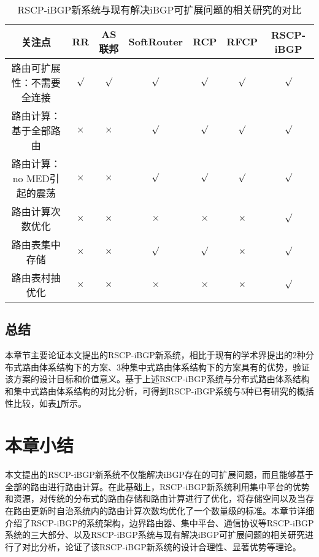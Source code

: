 \begin{table}[h]
	\centering
	\caption{RSCP-iBGP新系统与现有解决iBGP可扩展问题的相关研究的对比}
    \label{tab:compare}

    \begin{tabular}{@{}ccccccc@{}}
\toprule
关注点              & RR & AS联邦 & SoftRouter & RCP & RFCP & RSCP-iBGP \\ \midrule
路由可扩展性：不需要全连接    &  $\surd$ &  $\surd$  & $\surd$  &$\surd$ & $\surd$  &$\surd$       \\
路由计算：基于全部路由      &   $\times$ &  $\times$  & $\surd$  &$\surd$ & $\surd$  &$\surd$  \\
路由计算：no MED引起的震荡 & $\times$ &  $\times$  & $\surd$  &$\surd$ & $\surd$  &$\surd$  \\
路由计算次数优化         &   $\times$ &  $\times$  & $\times$  &$\times$ & $\times$  &$\surd$ \\
路由表集中存储          &  $\times$ &  $\times$  & $\surd$  &$\surd$ & $\times$  &$\surd$      \\
路由表村抽优化          & $\times$ &  $\times$  & $\times$  &$\times$ & $\times$  &$\surd$    \\ \bottomrule
\end{tabular}
\end{table}

\subsection{总结}

本章节主要论证本文提出的RSCP-iBGP新系统，相比于现有的学术界提出的2种分布式路由体系结构下的方案、3种集中式路由体系结构下的方案具有的优势，验证该方案的设计目标和价值意义。基于上述RSCP-iBGP系统与分布式路由体系结构和集中式路由体系结构的对比分析，可得到RSCP-iBGP系统与5种已有研究的概括性比较，如表\ref{tab:compare}所示。



\section{本章小结}

本文提出的RSCP-iBGP新系统不仅能解决iBGP存在的可扩展问题，而且能够基于全部的路由进行路由计算。在此基础上，RSCP-iBGP新系统利用集中平台的优势和资源，对传统的分布式的路由存储和路由计算进行了优化，将存储空间以及当存在路由更新时自治系统内的路由计算次数均优化了一个数量级的标准。本章节详细介绍了RSCP-iBGP的系统架构，边界路由器、集中平台、通信协议等RSCP-iBGP系统的三大部分、以及RSCP-iBGP系统与现有解决iBGP可扩展问题的相关研究进行了对比分析，论证了该RSCP-iBGP新系统的设计合理性、显著优势等理论。

